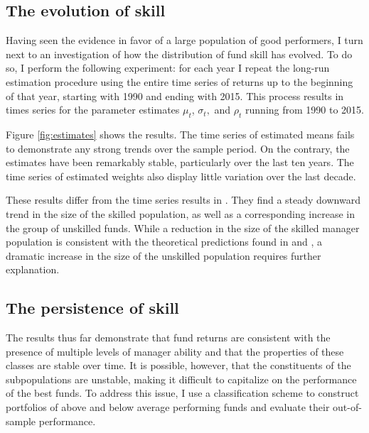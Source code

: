 	\subsection{The evolution of skill}
		Having seen the evidence in favor of a large population of good performers, I turn next to an investigation of how the distribution of fund skill has evolved. To do so, I perform the following experiment: for each year I repeat the long-run estimation procedure using the entire time series of returns up to the beginning of that year, starting with 1990 and ending with 2015. This process results in times series for the parameter estimates $\mu_t$, $\sigma_t,$ and $\rho_t$ running from 1990 to 2015.

		Figure \ref{fig:estimates} shows the results. The time series of estimated means fails to demonstrate any strong trends over the sample period. On the contrary, the estimates have been remarkably stable, particularly over the last ten years. The time series of estimated weights also display little variation over the last decade.

		These results differ from the time series results in \citet{Barras2010}.  They find a steady downward trend in the size of the skilled population, as well as a corresponding increase in the group of unskilled funds.  While a reduction in the size of the skilled manager population is consistent with the theoretical predictions found in \citet{Berk2004} and \citet{Pastor2012}, a dramatic increase in the size of the unskilled population requires further explanation.

	\subsection{The persistence of skill}
		The results thus far demonstrate that fund returns are consistent with the presence of multiple levels of manager ability and that the properties of these classes are stable over time. It is possible, however, that the constituents of the subpopulations are unstable, making it difficult to capitalize on the performance of the best funds. To address this issue, I use a classification scheme to construct portfolios of above and below average performing funds and evaluate their out-of-sample performance.

